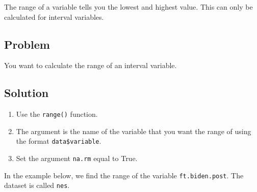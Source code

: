 \documentclass[
]{book}
\newenvironment{Shaded}{\begin{snugshade}}{\end{snugshade}}
\newcommand{\AttributeTok}[1]{\textcolor[rgb]{0.13,0.29,0.53}{#1}}
\newcommand{\CommentTok}[1]{\textcolor[rgb]{0.56,0.35,0.01}{\textit{#1}}}
\newcommand{\FunctionTok}[1]{\textcolor[rgb]{0.13,0.29,0.53}{\textbf{#1}}}
\newcommand{\NormalTok}[1]{#1}
\newcommand{\SpecialCharTok}[1]{\textcolor[rgb]{0.81,0.36,0.00}{\textbf{#1}}}
\providecommand{\tightlist}{%
  \setlength{\itemsep}{0pt}\setlength{\parskip}{0pt}}
\begin{document}
The range of a variable tells you the lowest and highest value. This can only be calculated for interval variables.

\hypertarget{problem-35}{%
\subsection{Problem}\label{problem-35}}

You want to calculate the range of an interval variable.

\hypertarget{solution-34}{%
\subsection{Solution}\label{solution-34}}

\begin{enumerate}
\def\labelenumi{\arabic{enumi}.}
\tightlist
\item
  Use the \texttt{range()} function.
\item
  The argument is the name of the variable that you want the range of using the format \texttt{data\$variable}.
\item
  Set the argument \texttt{na.rm} equal to True.
\end{enumerate}

\begin{Shaded}
\end{Shaded}

In the example below, we find the range of the variable \texttt{ft.biden.post}. The dataset is called \texttt{nes}.

\begin{Shaded}
\end{Shaded}
\end{document}
